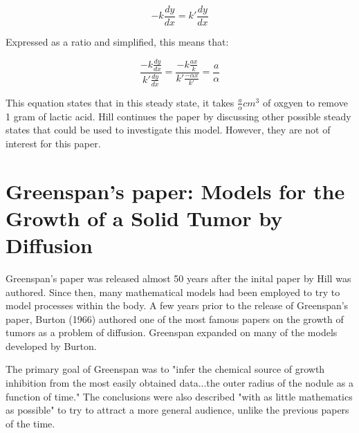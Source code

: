 \documentclass{article}
\begin{document}
\begin{equation}
    -k \frac{dy}{dx} = k' \frac{dy}{dx}
\end{equation}

Expressed as a ratio and simplified, this means that:

\begin{equation}
    \frac{-k \frac{dy}{dx}}{k' \frac{dy}{dx}} = \frac{-k\frac{ax}{k}}{k'\frac{-\alpha x}{k'}} = \frac{a}{\alpha}
\end{equation}

This equation states that in this steady state, it takes $\frac{a}{\alpha} cm^3$ of oxgyen to remove 1 gram of lactic acid. Hill continues
the paper by discussing other possible steady states that could be used to investigate this model. However, they are not of interest for
this paper.

\section{Greenspan's paper: Models for the Growth of a Solid Tumor by Diffusion}

Greenspan's paper was released almost 50 years after the inital paper by Hill was authored. Since then, many mathematical models
had been employed to try to model processes within the body. A few years prior to the release of Greenspan's paper, Burton (1966)
authored one of the most famous papers on the growth of tumors as a problem of diffusion. Greenspan expanded on many of the models
developed by Burton.

The primary goal of Greenspan was to "infer the chemical source of growth inhibition from the most easily obtained data...the outer radius
of the nodule as a function of time." The conclusions were also described "with as little mathematics as possible" to try to attract a more
general audience, unlike the previous papers of the time.
\end{document}
